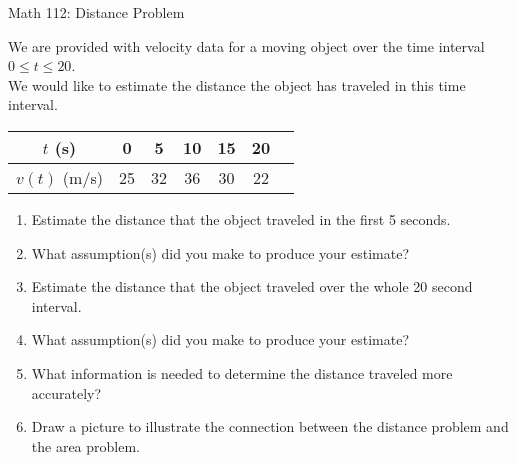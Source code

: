 \documentclass[11pt]{article}
\begin{document}
\begin{center}
\Large
\rm{Math 112:  Distance Problem}
\\
\end{center}
\vspace{0.2in}

We are provided with velocity data for a moving object over the time interval $0\leq t\leq 20$.  \\ We would like to estimate the distance the object has traveled in this time interval.

\vspace{0.5cm}
\begin{tabular}{|c| c| c| c| c| c| c|} \hline
$t$ (s) & 0 & 5 & 10 & 15 & 20  \\ 
\hline
$v(t)$ (m/s) & 25 & 32 & 36 & 30 & 22  \\ 
\hline
\end{tabular}

\vspace{0.5cm}

\begin{enumerate}
\item {Estimate the distance that the object traveled in the first 5 seconds.}
\item {What assumption(s) did you make to produce your estimate?}
\item {Estimate the distance that the object traveled over the whole 20 second interval.}
\item {What assumption(s) did you make to produce your estimate?}
\item {What information is needed to determine the distance traveled more accurately?}
\item {Draw a picture to illustrate the connection between the distance problem and the area problem.}
\end{enumerate}
\end{document}

